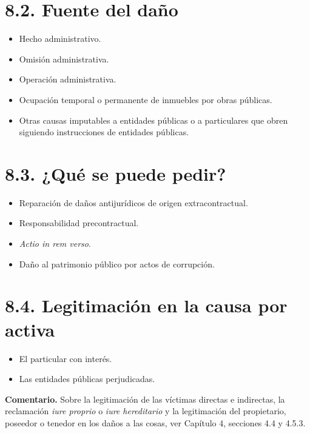\section{8.2. Fuente del daño}
\begin{itemize}
\item Hecho administrativo.
\item Omisión administrativa.
\item Operación administrativa.
\item Ocupación temporal o permanente de inmuebles por obras públicas.
\item Otras causas imputables a entidades públicas o a particulares que obren siguiendo instrucciones de entidades públicas.
\end{itemize}
\section{8.3. ¿Qué se puede pedir?}
\begin{itemize}
\item Reparación de daños antijurídicos de origen extracontractual.
\item Responsabilidad precontractual.
\item \textit{Actio in rem verso}.
\item Daño al patrimonio público por actos de corrupción.
\end{itemize}
\section{8.4. Legitimación en la causa por activa}
\begin{itemize}
\item El particular con interés.
\item Las entidades públicas perjudicadas.
\end{itemize}
\begin{comentario}
\textcolor[HTML]{8A6D3B}{\textbf{Comentario. }}Sobre la legitimación de las víctimas directas e indirectas, la reclamación \textit{iure proprio} o \textit{iure hereditario} y la legitimación del propietario, poseedor o tenedor en los daños a las cosas, ver Capítulo 4, secciones 4.4 y 4.5.3.
\end{comentario}
